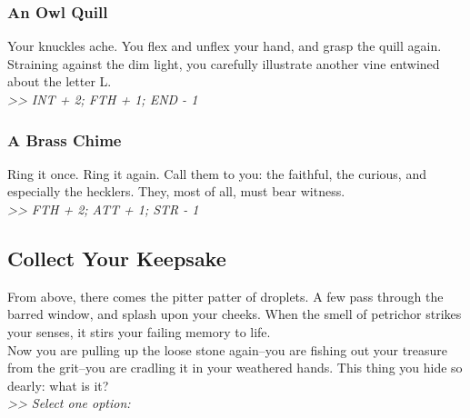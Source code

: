 \begin{multicols*}{2}
\subsubsection*{An Owl Quill}
Your knuckles ache. You flex and unflex your hand, and grasp the quill again. Straining against the dim light, you carefully illustrate another vine entwined about the letter L.\\
\emph{>> INT + 2; FTH + 1; END - 1}

\subsubsection*{A Brass Chime}
Ring it once. Ring it again. Call them to you: the faithful, the curious, and especially the hecklers. They, most of all, must bear witness.\\
\emph{>> FTH + 2; ATT + 1; STR - 1}

\vfill
\end{multicols*}
\pagebreak

\subsection*{Collect Your Keepsake}
From above, there comes the pitter patter of droplets. A few pass through the barred window, and splash upon your cheeks. When the smell of petrichor strikes your senses, it stirs your failing memory to life.\\
Now you are pulling up the loose stone again--you are fishing out your treasure from the grit--you are cradling it in your weathered hands. This thing you hide so dearly: what is it?\\
\emph{>> Select one option:}

